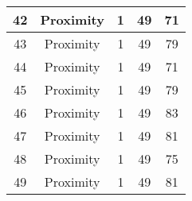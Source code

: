 \documentclass[results.tex]{subfiles}
\begin{document}
\begin{center}
\begin{tabular}{| c || c | c | c | c |}
            \hline
            42                      & Proximity                    & 1                      & 49                      & 71                   \\
            \hline
            43                      & Proximity                    & 1                      & 49                      & 79                   \\
            \hline
            44                      & Proximity                    & 1                      & 49                      & 71                   \\
            \hline
            45                      & Proximity                    & 1                      & 49                      & 79                   \\
            \hline
            46                      & Proximity                    & 1                      & 49                      & 83                   \\
            \hline
            47                      & Proximity                    & 1                      & 49                      & 81                   \\
            \hline
            48                      & Proximity                    & 1                      & 49                      & 75                   \\
            \hline
            49                      & Proximity                    & 1                      & 49                      & 81                   \\
            \hline
        \end{tabular}
    \end{center}
\end{document}
